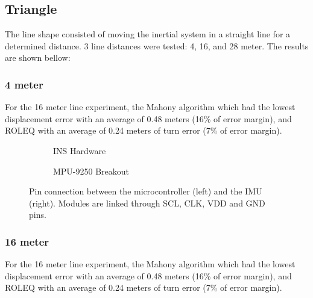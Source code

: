 \subsection{Triangle}

The line shape consisted of moving the inertial system in a straight line for a determined distance. 3 line distances were tested: 4, 16, and 28 meter. The results are shown bellow:

\subsubsection{4 meter}

For the 16 meter line experiment, the Mahony algorithm which had the lowest displacement error with an average of 0.48 meters (16\% of error margin), and ROLEQ with an average of 0.24 meters of turn error (7\% of error margin).

\begin{figure}[!h]
    \centering
    
\end{figure}

\begin{figure}[!h]
    \centering
    \begin{subfigure}{0.49\textwidth}
        \centering
        \resizebox{1\linewidth}{!}{}
        \caption{INS Hardware}
        \label{fig:triangle4_2D}
    \end{subfigure}
    \begin{subfigure}{0.49\textwidth}
        \centering
        \resizebox{1\linewidth}{!}{}
        \caption{MPU-9250 Breakout}
        \label{fig:triangle4_3D}
    \end{subfigure}
    \caption{Pin connection between the microcontroller (left) and the IMU (right). Modules are linked through SCL, CLK, VDD and GND pins.}
    \label{fig:triangle4}
\end{figure}

\subsubsection{16 meter}

For the 16 meter line experiment, the Mahony algorithm which had the lowest displacement error with an average of 0.48 meters (16\% of error margin), and ROLEQ with an average of 0.24 meters of turn error (7\% of error margin).

\begin{figure}[!h]
    \centering
    
\end{figure}

